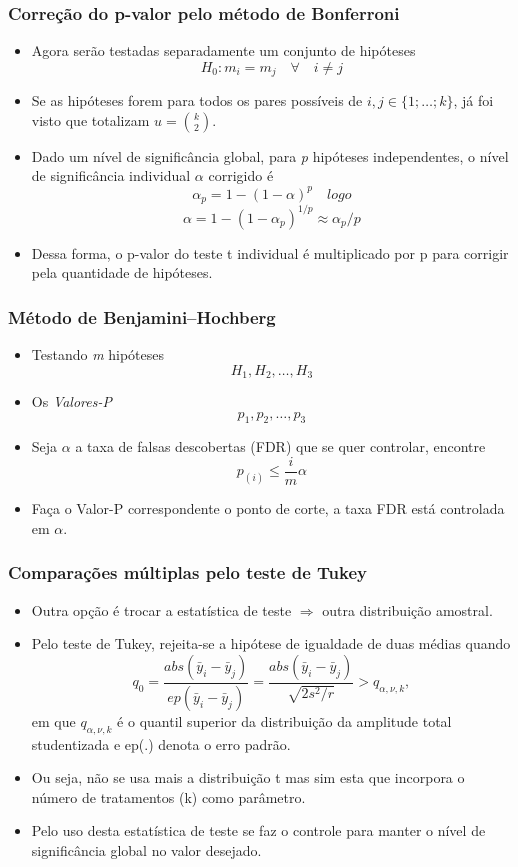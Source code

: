 \documentclass{beamer}
\begin{document}
\begin{frame}
\frametitle{Correção do p-valor pelo método de Bonferroni}

\begin{itemize}
\item Agora serão testadas separadamente um conjunto de hipóteses
\[H_0: m_i = m_j \quad \forall \quad i \neq j\]
\item Se as hipóteses forem para todos os pares possíveis de \(i, j \in \{1; \ldots; k\}\), já foi visto que totalizam \(u = \binom{k}{2}\).
\item Dado um nível de significância global, para \textit{p} hipóteses independentes, o nível de significância individual \(\alpha\) corrigido é
\[\alpha_p=1-(1-\alpha)^p\quad logo\]
\[\alpha = 1-(1-\alpha_p)^{1/p} \approx \alpha_p/p\]
\item Dessa forma, o p-valor do teste t individual é multiplicado por p para corrigir pela quantidade de hipóteses. 
\end{itemize}

\end{frame}

\begin{frame}
\frametitle{Método de Benjamini–Hochberg}

\begin{itemize}
\item Testando \textit{m} hipóteses
\[H_1, H_2, \ldots, H_3\]
\item Os \textit{Valores-P}
\[p_1, p_2, \ldots, p_3\]
\item Seja \(\alpha\) a taxa de falsas descobertas (FDR) que se quer controlar, encontre
\[p_{(i)} \leq \frac{i}{m}\alpha\]
\item Faça o Valor-P correspondente o ponto de corte, a taxa FDR está controlada em \(\alpha\). 
\end{itemize}

\end{frame}

\begin{frame}
\frametitle{Comparações múltiplas pelo teste de Tukey}

\begin{itemize}
\item Outra opção é trocar a estatística de teste \(\Rightarrow\) outra distribuição amostral.
\item Pelo teste de Tukey, rejeita-se a hipótese de igualdade de duas médias quando
\[q_0 = \frac{abs(\bar{y}_i-\bar{y}_j)}{ep(\bar{y}_i-\bar{y}_j)}=\frac{abs(\bar{y}_i-\bar{y}_j)}{\sqrt{2s^2/r}} > q_{\alpha, \nu, k},\]
em que \(q_{\alpha, \nu, k}\) é o quantil superior da distribuição da amplitude total studentizada e ep(.) denota o erro padrão.
\item Ou seja, não se usa mais a distribuição t mas sim esta que incorpora o número de tratamentos (k) como parâmetro.
\item Pelo uso desta estatística de teste se faz o controle para manter o nível de significância global no valor desejado. 
\end{itemize}

\end{frame}
\end{document}
